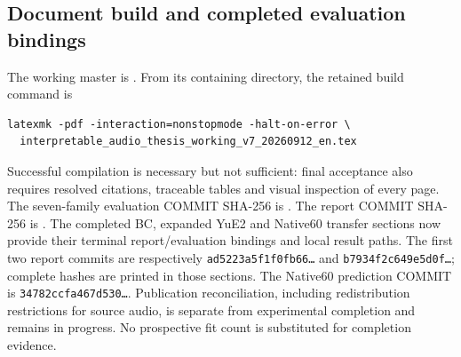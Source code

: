 \subsection{Document build and completed evaluation bindings}
The working master is
.
From its containing directory, the retained build command is
\begin{verbatim}
latexmk -pdf -interaction=nonstopmode -halt-on-error \
  interpretable_audio_thesis_working_v7_20260912_en.tex
\end{verbatim}
Successful compilation is necessary but not sufficient: final acceptance
also requires resolved citations, traceable tables and visual inspection of
every page. The seven-family evaluation COMMIT SHA-256 is
.
The report COMMIT SHA-256 is
.
The completed BC, expanded YuE2 and Native60 transfer sections now provide
their terminal report/evaluation bindings and local result paths. The first two
report commits are respectively \texttt{ad5223a5f1f0fb66\ldots} and
\texttt{b7934f2c649e5d0f\ldots}; complete hashes are printed in those sections.
The Native60 prediction COMMIT is \texttt{34782ccfa467d530\ldots}.
Publication reconciliation, including redistribution restrictions for source
audio, is separate from experimental completion and remains in progress.
No prospective fit count is substituted for completion evidence.\par
\endgroup
